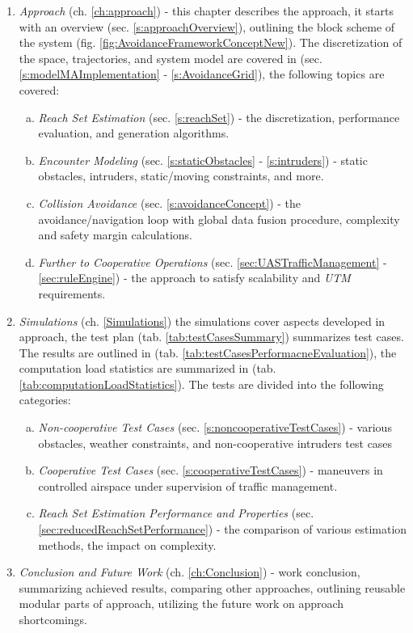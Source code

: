 \begin{enumerate}
    \item \emph{Approach} (ch. \ref{ch:approach}) - this chapter describes the approach, it starts with an overview (sec. \ref{s:approachOverview}), outlining the block scheme of the system (fig. \ref{fig:AvoidanceFrameworkConceptNew}). The discretization of the space, trajectories, and system model are covered in (sec. \ref{s:modelMAImplementation} - \ref{s:AvoidanceGrid}), the following topics are covered:
    \begin{enumerate}[a.]
        \item \emph{Reach Set Estimation} (sec. \ref{s:reachSet}) - the discretization, performance evaluation, and generation algorithms.
        
        \item \emph{Encounter Modeling} (sec. \ref{s:staticObstacles} - \ref{s:intruders}) - static obstacles, intruders, static/moving constraints, and more.
        
        \item \emph{Collision Avoidance} (sec. \ref{s:avoidanceConcept}) - the avoidance/navigation loop with global data fusion procedure, complexity and safety margin calculations.
        
        \item \emph{Further to Cooperative Operations} (sec. \ref{sec:UASTrafficManagement} - \ref{sec:ruleEngine}) - the approach to satisfy scalability and \emph{UTM} requirements.
    \end{enumerate}
    
    \item \emph{Simulations} (ch. \ref{Simulations}) the simulations cover aspects developed in approach, the test plan (tab. \ref{tab:testCasesSummary}) summarizes test cases. The results are outlined in (tab. \ref{tab:testCasesPerformacneEvaluation}), the computation load statistics are summarized in (tab. \ref{tab:computationLoadStatistics}). The tests are divided into the following categories:
    
    \begin{enumerate}[a.]
        \item \emph{Non-cooperative Test Cases} (sec. \ref{s:noncooperativeTestCases}) - various obstacles, weather constraints, and non-cooperative intruders test cases
    
        \item \emph{Cooperative Test Cases} (sec. \ref{s:cooperativeTestCases}) - maneuvers in controlled airspace under supervision of traffic management.
    
        \item \emph{Reach Set Estimation Performance and Properties} (sec. \ref{sec:reducedReachSetPerformance}) - the comparison of various estimation methods, the impact on complexity.
    \end{enumerate}
    
    \item \emph{Conclusion and Future Work} (ch. \ref{ch:Conclusion}) - work conclusion, summarizing achieved results, comparing other approaches, outlining reusable modular parts of approach, utilizing the future work on approach shortcomings.
\end{enumerate}